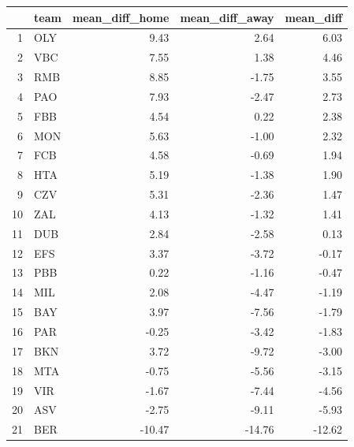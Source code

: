 \begin{table}[ht]
\centering
\begin{tabular}{rlrrr}
  \hline
 & team & mean\_diff\_home & mean\_diff\_away & mean\_diff \\ 
  \hline
1 & OLY & 9.43 & 2.64 & 6.03 \\ 
  2 & VBC & 7.55 & 1.38 & 4.46 \\ 
  3 & RMB & 8.85 & -1.75 & 3.55 \\ 
  4 & PAO & 7.93 & -2.47 & 2.73 \\ 
  5 & FBB & 4.54 & 0.22 & 2.38 \\ 
  6 & MON & 5.63 & -1.00 & 2.32 \\ 
  7 & FCB & 4.58 & -0.69 & 1.94 \\ 
  8 & HTA & 5.19 & -1.38 & 1.90 \\ 
  9 & CZV & 5.31 & -2.36 & 1.47 \\ 
  10 & ZAL & 4.13 & -1.32 & 1.41 \\ 
  11 & DUB & 2.84 & -2.58 & 0.13 \\ 
  12 & EFS & 3.37 & -3.72 & -0.17 \\ 
  13 & PBB & 0.22 & -1.16 & -0.47 \\ 
  14 & MIL & 2.08 & -4.47 & -1.19 \\ 
  15 & BAY & 3.97 & -7.56 & -1.79 \\ 
  16 & PAR & -0.25 & -3.42 & -1.83 \\ 
  17 & BKN & 3.72 & -9.72 & -3.00 \\ 
  18 & MTA & -0.75 & -5.56 & -3.15 \\ 
  19 & VIR & -1.67 & -7.44 & -4.56 \\ 
  20 & ASV & -2.75 & -9.11 & -5.93 \\ 
  21 & BER & -10.47 & -14.76 & -12.62 \\ 
   \hline
\end{tabular}
\end{table}
